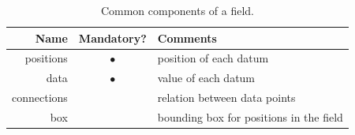 \documentclass[twoside,11pt]{starlink}
\begin{document}
\begin{table}[htbp]

\begin{center}
\begin{tabular}{rcl}
Name        & Mandatory? & Comments                                \\ \hline
positions   & $\bullet$  & position of each datum                  \\
data        & $\bullet$  & value of each datum                     \\
connections &            & relation between data points            \\
box         &            & bounding box for positions in the field \\
\end{tabular}
\end{center}

\begin{quote}
\item \caption[Common components of a field.]{Common components of a field.
\label{COMPONENTS} }
\end{quote}

\end{table}
\end{document}

